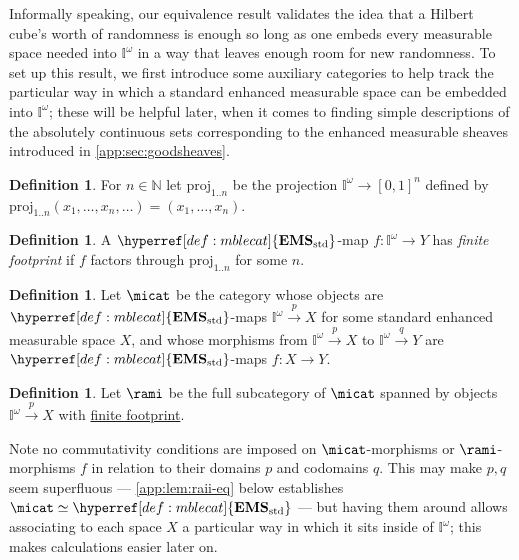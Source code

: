 \documentclass[
  sigconf,
  screen, ]{acmart}
\theoremstyle{definition}
\newtheorem{definition}[theorem]{Definition}
\newcommand\N{\mathbb N}
\newcommand\nref[2]{\hyperref[#1]{#2}} \newcommand\checkhigh{{\huge{\color{red}\textbf{TODO: check}}}}
\newcommand\texhcube{{{{\mathbb I}^\omega}}}
\newcommand\hcube{{\nref{def:hcube}{\texhcube}}}
\newcommand\texagoodname{absolutely continuous set}
\newcommand\agoodname{\texagoodname}
\newcommand\sheafcatadj{enhanced measurable}
\newcommand\texgoodsheaves{\sheafcatadj{} sheaves}
\newcommand\goodsheaves{\texgoodsheaves}
\newcommand\texStdMble{\mathbf{EMS}_{\rm std}}
\newcommand\StdMble{{\nref{def:mblecat}{\texStdMble}}}
\begin{document}
Informally speaking, our equivalence result
validates the idea that a Hilbert cube's worth of
randomness is enough so long as one
embeds every measurable space
needed into $\hcube$ in a way that leaves
enough room for new randomness.
To set up this result,
we first introduce some auxiliary categories
to help track the particular way in which
a standard enhanced measurable space
can be embedded into $\hcube$;
these will be helpful later, when
it comes to finding simple descriptions
of the \agoodname{s} corresponding to
the \goodsheaves{} introduced in \cref{app:sec:goodsheaves}.

\renewcommand\hcubeproj[1]{{\nref{app:def:projn}{\mathrm{proj}_{1..#1}}}}
\renewcommand\embedmap[1]{{#1\nref{app:def:embedmap}{\otimes1_\hcube}}}

\begin{definition} \label{app:def:projn}
  For $n\in \N$ let $\hcubeproj n$
  be the projection $\hcube\to[0,1]^n$
  defined by $\hcubeproj n (x_1,\dots,x_n,\dots) = (x_1,\dots,x_n)$.
\end{definition}

\begin{definition} \label{app:def:mblespcramap}
  A $\StdMble$-map 
  $f : \hcube\to Y$
  has \emph{finite footprint}
  if $f$ factors through $\hcubeproj n$ for some $n$.
\end{definition}

\begin{definition} \label{app:def:micat}
  Let $\micat$ be the category 
  whose objects are
  $\StdMble$-maps
  $\hcube \xrightarrow p X$
  for some standard enhanced measurable space $X$,
  and whose morphisms
  from $\hcube \xrightarrow p X$
  to $\hcube\xrightarrow qY$
  are $\StdMble$-maps
  $f : X\to Y$.
\end{definition}

\begin{definition} \label{app:def:rami}
  Let $\rami$ be the full subcategory
  of $\micat$ spanned by
  objects $\hcube\xrightarrow p X$
  with \nref{app:def:mblespcramap}{finite footprint}.
\end{definition}

Note no commutativity conditions are imposed on
$\micat$-morphisms or $\rami$-morphisms $f$ in relation to their domains $p$
and codomains $q$. This may make $p,q$ seem
superfluous --- \cref{app:lem:raii-eq} below
establishes $\micat\simeq\StdMble$ --- but having
them around allows associating to each space $X$
a particular way in which it sits inside of $\hcube$;
this makes calculations easier later on.
\end{document}

